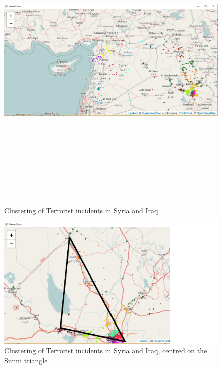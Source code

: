 \begin{figure}[t]
\includegraphics[width=15cm,height=15cm]{Peters_experiment_markdown_files/figure-latex/Capture_Kmeans_Leaflet_2015_Deaths_Iraq_Syria_K20.png}
\caption{Clustering of Terrorist incidents in Syria and Iraq}
\label{fig:kmeansSyriaIraq}
\centering
\end{figure} 

\begin{figure}[t]
\includegraphics[width=15cm]{Peters_experiment_markdown_files/figure-latex/Capture_Kmeans_Leaflet_2015_Deaths_Iraq_Syria_K20_Sunni_Triangle_2.png}
\caption{Clustering of Terrorist incidents in Syria and Iraq, centred on the Sunni triangle}
\label{fig:kmeansSyriaIraqSunniTriangle}
\centering
\end{figure}

